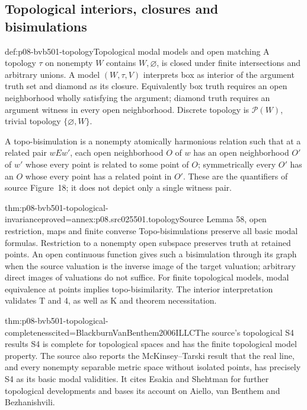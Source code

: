 \subsection{Topological interiors, closures and bisimulations}
\label{sec:p08-bvb501-topology}

\begin{hbdefinition}{def:p08-bvb501-topology}{Topological modal models and open matching}
A topology \(\tau\) on nonempty \(W\) contains \(W,\varnothing\),
is closed under finite intersections and arbitrary unions. A model
\((W,\tau,V)\) interprets box as interior of the argument truth
set and diamond as its closure. Equivalently box truth requires an
open neighborhood wholly satisfying the argument; diamond truth requires
an argument witness in every open neighborhood. Discrete topology is
\(\mathcal P(W)\), trivial topology \(\{\varnothing,W\}\).

A topo-bisimulation is a nonempty atomically harmonious relation such
that at a related pair \(wEw'\), each open neighborhood \(O\)
of \(w\) has an open neighborhood \(O'\) of \(w'\)
whose every point is related to some point of \(O\); symmetrically
every \(O'\) has an \(O\) whose every point has a related
point in \(O'\). These are the quantifiers of source Figure~18;
it does not depict only a single witness pair.
\end{hbdefinition}

\begin{hbtheorem}{thm:p08-bvb501-topological-invariance}{proved=annex:p08.src025501.topology}{Source Lemma 58, open restriction, maps and finite converse}
Topo-bisimulations preserve all basic modal formulas. Restriction to a
nonempty open subspace preserves truth at retained points. An open
continuous function gives such a bisimulation through its graph when
the source valuation is the inverse image of the target valuation;
arbitrary direct images of valuations do not suffice. For finite
topological models, modal equivalence at points implies topo-bisimilarity.
The interior interpretation validates T and 4, as well as K and
theorem necessitation.
\end{hbtheorem}

\begin{hbtheorem}{thm:p08-bvb501-topological-completeness}{cited=BlackburnVanBenthem2006ILLC}{The source's topological S4 results}
S4 is complete for topological spaces and has the finite topological
model property. The source also reports the McKinsey--Tarski result
that the real line, and every nonempty separable metric space without
isolated points, has precisely S4 as its basic modal validities.
It cites Esakia and Shehtman for further topological developments and
bases its account on Aiello, van Benthem and Bezhanishvili.
\end{hbtheorem}

